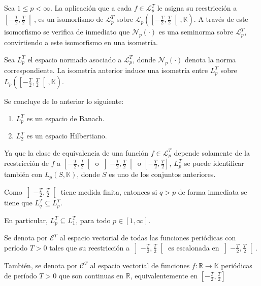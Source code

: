 \documentclass[12pt]{report}
\theoremstyle{largebreak}
\newcommand\cf[3]{\ensuremath{#1:#2\rightarrow#3}}
\newcommand{\N}[2]{\ensuremath{\mathcal{N}_{#1}\left(#2\right)}}
\begin{document}
    \begin{obs}
        Sea $1\leq p<\infty$. La aplicación que a cada $f\in\mathcal{L}_p^T$ le asigna su reestricción a $\left[-\frac{T}{2},\frac{T}{2} \right[$, es un isomorfismo de $\mathcal{L}_p^T$ sobre $\mathcal{L}_p(\left[-\frac{T}{2},\frac{T}{2} \right[,\mathbb{K})$. A través de este isomorfismo se verifica de inmediato que $\N{p}{\cdot}$ es una seminorma sobre $\mathcal{L}_p^T$, convirtiendo a este isomorfismo en una isometría.
    \end{obs}

    Sea $L_p^T$ el espacio normado asociado a $\mathcal{L}_p^T$, donde $\N{p}{\cdot}$ denota la norma correspondiente. La isometría anterior induce una isometría entre $L_p^T$ sobre $L_p(\left[-\frac{T}{2},\frac{T}{2} \right[,\mathbb{K})$.

    Se concluye de lo anterior lo siguiente:
    \begin{enumerate}
        \item $L_p^T$ es un espacio de Banach.
        \item $L_2^T$ es un espacio Hilbertiano.
    \end{enumerate}
    Ya que la clase de equivalencia de una función $f\in\mathcal{L}_p^T$ depende solamente de la reestricción de $f$ a $\left[-\frac{T}{2},\frac{T}{2} \right[$ o $\left]-\frac{T}{2},\frac{T}{2} \right[$ o $\left[-\frac{T}{2},\frac{T}{2} \right]$, $L_p^T$ se puede identificar también con $L_p(S,\mathbb{K})$, donde $S$ es uno de los conjuntos anteriores.

    Como $\left]-\frac{T}{2},\frac{T}{2} \right[$ tiene medida finita, entonces si $q>p$ de forma inmediata se tiene que $L_q^T\subseteq L_p^T$.

    En particular, $L_p^T\subseteq L_1^T$, para todo $p\in\left[1,\infty \right]$.

    \begin{mydef}
        Se denota por $\mathcal{E}^T$ al espacio vectorial de todas las funciones periódicas con período $T>0$ tales que su reestricción a $\left]-\frac{T}{2},\frac{T}{2} \right[$ es escalonada en $\left]-\frac{T}{2},\frac{T}{2} \right[$.

        También, se denota por $\mathcal{C}^T$ al espacio vectorial de funciones $\cf{f}{\mathbb{R}}{\mathbb{K}}$ periódicas de período $T>0$ que son continuas en $\mathbb{R}$, equivalentemente en $\left[-\frac{T}{2},\frac{T}{2} \right]$
    \end{mydef}
\end{document}
